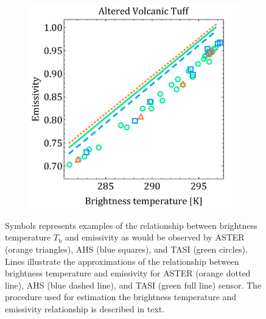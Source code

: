 \begin{figure}[htb]
\begin{subfigure}[t]{.3\linewidth}
		\vspace{-0.1cm}
		\caption{}
		\label{fig:QuartzEmissivity}
	\end{subfigure}
	\hspace{1em}
	\begin{subfigure}[t]{.3\linewidth}
		\centering
		\includegraphics[scale=0.3]{pics/Chapter_03/pivov4.pdf}
		\vspace{-0.1cm}
		\caption{}
		\label{fig:QuartzRadiance}
	\end{subfigure}
	\vspace{1.5 em}
	\caption{Symbols represents examples of the relationship between brightness temperature $T_\mathrm{b}$ and emissivity as would be observed by ASTER (orange triangles), AHS (blue squares), and TASI (green circles). Lines illustrate the approximations of the relationship between brightness temperature and emissivity for ASTER (orange dotted line), AHS (blue dashed line), and TASI (green full line) sensor. The procedure used for estimation the brightness temperature and emissivity relationship is described in text.}
	\label{fig:relationship}
\end{figure}

